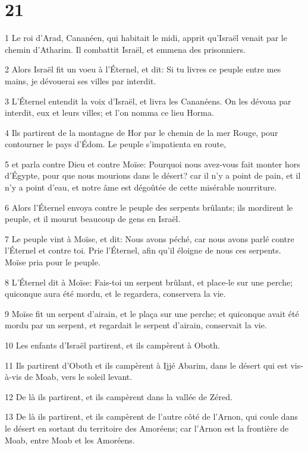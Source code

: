 \chapter{21}

\par 1 Le roi d'Arad, Cananéen, qui habitait le midi, apprit qu'Israël venait par le chemin d'Atharim. Il combattit Israël, et emmena des prisonniers.
\par 2 Alors Israël fit un voeu à l'Éternel, et dit: Si tu livres ce peuple entre mes mains, je dévouerai ses villes par interdit.
\par 3 L'Éternel entendit la voix d'Israël, et livra les Cananéens. On les dévoua par interdit, eux et leurs villes; et l'on nomma ce lieu Horma.
\par 4 Ils partirent de la montagne de Hor par le chemin de la mer Rouge, pour contourner le pays d'Édom. Le peuple s'impatienta en route,
\par 5 et parla contre Dieu et contre Moïse: Pourquoi nous avez-vous fait monter hors d'Égypte, pour que nous mourions dans le désert? car il n'y a point de pain, et il n'y a point d'eau, et notre âme est dégoûtée de cette misérable nourriture.
\par 6 Alors l'Éternel envoya contre le peuple des serpents brûlants; ils mordirent le peuple, et il mourut beaucoup de gens en Israël.
\par 7 Le peuple vint à Moïse, et dit: Nous avons péché, car nous avons parlé contre l'Éternel et contre toi. Prie l'Éternel, afin qu'il éloigne de nous ces serpents. Moïse pria pour le peuple.
\par 8 L'Éternel dit à Moïse: Fais-toi un serpent brûlant, et place-le sur une perche; quiconque aura été mordu, et le regardera, conservera la vie.
\par 9 Moïse fit un serpent d'airain, et le plaça sur une perche; et quiconque avait été mordu par un serpent, et regardait le serpent d'airain, conservait la vie.
\par 10 Les enfants d'Israël partirent, et ils campèrent à Oboth.
\par 11 Ils partirent d'Oboth et ils campèrent à Ijjé Abarim, dans le désert qui est vis-à-vis de Moab, vers le soleil levant.
\par 12 De là ils partirent, et ils campèrent dans la vallée de Zéred.
\par 13 De là ils partirent, et ils campèrent de l'autre côté de l'Arnon, qui coule dans le désert en sortant du territoire des Amoréens; car l'Arnon est la frontière de Moab, entre Moab et les Amoréens.

